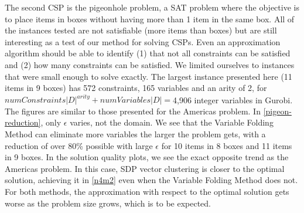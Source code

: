 \documentclass[12pt]{article} %
\begin{document}
\FloatBarrier
The second CSP is the pigeonhole problem, a SAT problem where the objective is to place items in boxes without having more than 1 item in the same box. All of the instances tested are not satisfiable (more items than boxes) but are still interesting as a test of our method for solving CSPs. Even an approximation algorithm should be able to identify (1) that not all constraints can be satisfied and (2) how many constraints can be satisfied. We limited ourselves to instances that were small enough to solve exactly. The largest instance presented here (11 items in 9 boxes) has 572 constraints, 165 variables and an arity of 2, for $numConstraints |D|^{arity} + numVariables |D|=$4,906 integer variables in Gurobi. The figures are similar to those presented for the Americas problem. In \autoref{pigeon-reduction}, only $\epsilon$ varies, not the domain. We see that the Variable Folding Method can eliminate more variables the larger the problem gets, with a reduction of over 80\% possible with large $\epsilon$ for 10 items in 8 boxes and 11 items in 9 boxes. In the solution quality plots, we see the exact opposite trend as the Americas problem. In this case, SDP vector clustering is closer to the optimal solution, achieving it in \ref{n4m2} even when the Variable Folding Method does not. For both methods, the approximation with respect to the optimal solution gets worse as the problem size grows, which is to be expected.
\end{document}
